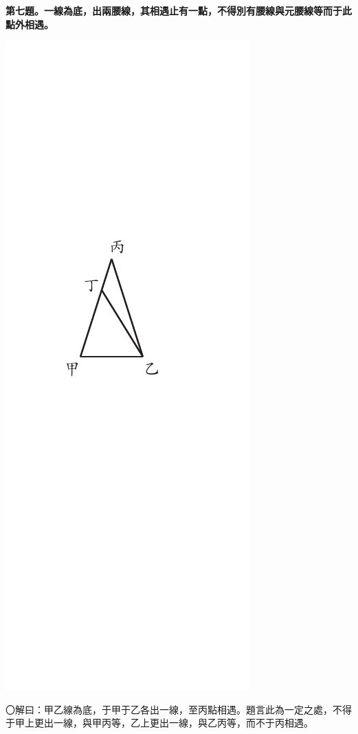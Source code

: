 \documentclass[12pt,b5paper,landscape]{article}
\newcommand{\bcom}[1]{〇#1}
\newcommand{\cthm}[1]{{
\vspace{8pt}

\bfseries #1}}
\begin{document}
\begin{multicols}{2}
\cthm{第七題。一線為底，出兩腰線，其相遇止有一點，不得別有腰線與元腰線等而于此點外相遇。}
\begin{center}
\includegraphics[angle=90]{eu42}
\end{center}
\bcom{解曰：甲乙線為底，于甲于乙各出一線，至丙點相遇。題言此為一定之處，不得于甲上更出一線，與甲丙等，乙上更出一線，與乙丙等，而不于丙相遇。}
\begin{center}

\end{center}
\end{multicols}
\end{document}
